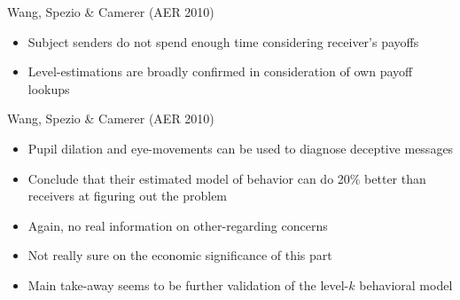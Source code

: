 \documentclass{beamer}
\begin{document}
\begin{frame}{Wang, Spezio \& Camerer (AER 2010)}
\begin{card}
	\begin{itemize}
		\item Subject senders do not spend enough time considering receiver's payoffs
		\item Level-estimations are broadly confirmed in consideration of own payoff lookups
	\end{itemize}
\end{card}
\end{frame}

\begin{frame}{Wang, Spezio \& Camerer (AER 2010)}
    \begin{card}
    	\begin{itemize}
    		\item Pupil dilation and eye-movements can be used to diagnose deceptive messages
    		\item Conclude that their estimated model of behavior can do 20\% better than receivers at figuring out the problem\pause
    		\item Again, no real information on other-regarding concerns
    		\item Not really sure on the economic significance of this part
    		\item Main take-away seems to be further validation of the level-$k$ behavioral model
    	\end{itemize}
    \end{card}
\end{frame}
\end{document}
